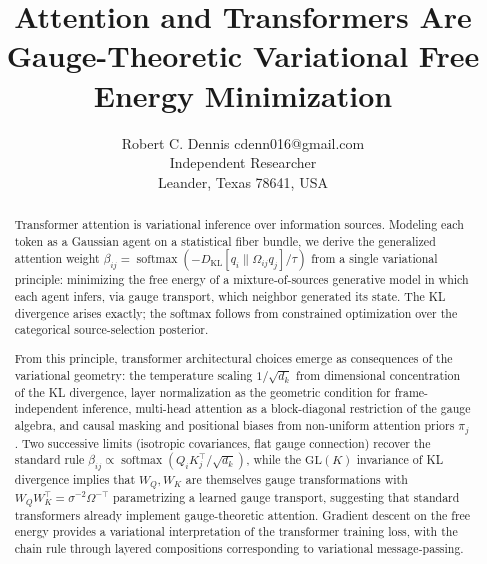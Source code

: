 \documentclass[twoside,11pt]{article}
\begin{document}

\title{Attention and Transformers Are Gauge-Theoretic Variational Free Energy Minimization}

\author{\name Robert C. Dennis \email cdenn016@gmail.com \\
       \addr Independent Researcher\\
       \addr Leander, Texas 78641, USA}


\maketitle

\begin{abstract}
Transformer attention is variational inference over information sources. Modeling each token as a Gaussian agent on a statistical fiber bundle, we derive the generalized attention weight $\beta_{ij} = \operatorname{softmax}(-D_{\mathrm{KL}}[q_i \| \Omega_{ij} q_j] / \tau)$ from a single variational principle: minimizing the free energy of a mixture-of-sources generative model in which each agent infers, via gauge transport, which neighbor generated its state. The KL divergence arises exactly; the softmax follows from constrained optimization over the categorical source-selection posterior.

From this principle, transformer architectural choices emerge as consequences of the variational geometry: the temperature scaling $1/\sqrt{d_k}$ from dimensional concentration of the KL divergence, layer normalization as the geometric condition for frame-independent inference, multi-head attention as a block-diagonal restriction of the gauge algebra, and causal masking and positional biases from non-uniform attention priors $\pi_j$. Two successive limits (isotropic covariances, flat gauge connection) recover the standard rule $\beta_{ij} \propto \operatorname{softmax}(Q_i K_j^\top / \sqrt{d_k})$, while the $\mathrm{GL}(K)$ invariance of KL divergence implies that $W_Q, W_K$ are themselves gauge transformations with $W_Q W_K^\top = \sigma^{-2}\Omega^{-\top}$ parametrizing a learned gauge transport, suggesting that standard transformers already implement gauge-theoretic attention. Gradient descent on the free energy provides a variational interpretation of the transformer training loss, with the chain rule through layered compositions corresponding to variational message-passing.


\end{abstract}
\end{document}
